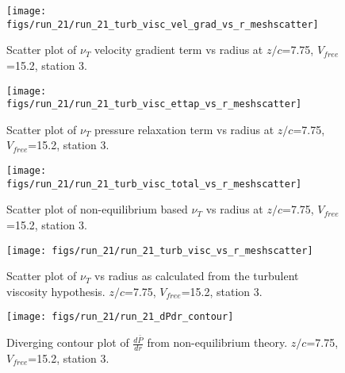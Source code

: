 \begin{figure}[H]
\centering
\texttt{[image: figs/run\_21/run\_21\_turb\_visc\_vel\_grad\_vs\_r\_meshscatter]}
\caption{Scatter plot of $\nu_T$ velocity gradient term vs radius at $z/c$=7.75, $V_{free}$=15.2, station 3.}
\end{figure}


\begin{figure}[H]
\centering
\texttt{[image: figs/run\_21/run\_21\_turb\_visc\_ettap\_vs\_r\_meshscatter]}
\caption{Scatter plot of $\nu_T$ pressure relaxation term vs radius at $z/c$=7.75, $V_{free}$=15.2, station 3.}
\end{figure}


\begin{figure}[H]
\centering
\texttt{[image: figs/run\_21/run\_21\_turb\_visc\_total\_vs\_r\_meshscatter]}
\caption{Scatter plot of non-equilibrium based $\nu_T$ vs radius at $z/c$=7.75, $V_{free}$=15.2, station 3.}
\end{figure}


\begin{figure}[H]
\centering
\texttt{[image: figs/run\_21/run\_21\_turb\_visc\_vs\_r\_meshscatter]}
\caption{Scatter plot of $\nu_T$ vs radius as calculated from the turbulent viscosity hypothesis. $z/c$=7.75, $V_{free}$=15.2, station 3.}
\end{figure}


\begin{figure}[H]
\centering
\texttt{[image: figs/run\_21/run\_21\_dPdr\_contour]}
\caption{Diverging contour plot of $\frac{d\bar{P}}{dr}$ from non-equilibrium theory. $z/c$=7.75, $V_{free}$=15.2, station 3.}
\end{figure}


